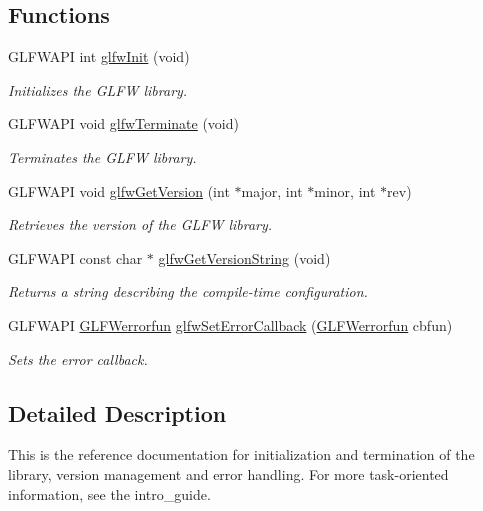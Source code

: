 \subsection*{Functions}
\begin{CompactItemize}
\item 
GLFWAPI int \hyperlink{group__init_gb41771f0215a2e0afb4cf1cf98082d40}{glfwInit} (void)
\begin{CompactList}\small\item\em Initializes the GLFW library. \item\end{CompactList}\item 
GLFWAPI void \hyperlink{group__init_gfd90e6fd4819ea9e22e5e739519a6504}{glfwTerminate} (void)
\begin{CompactList}\small\item\em Terminates the GLFW library. \item\end{CompactList}\item 
GLFWAPI void \hyperlink{group__init_g2402c7824ac0194c13722790ff9559ff}{glfwGetVersion} (int $\ast$major, int $\ast$minor, int $\ast$rev)
\begin{CompactList}\small\item\em Retrieves the version of the GLFW library. \item\end{CompactList}\item 
GLFWAPI const char $\ast$ \hyperlink{group__init_g4b9092ac5eace57d94d3cd551d6b8ded}{glfwGetVersionString} (void)
\begin{CompactList}\small\item\em Returns a string describing the compile-time configuration. \item\end{CompactList}\item 
GLFWAPI \hyperlink{group__init_g6f2c8574259246a83b1d0c3baf23046f}{GLFWerrorfun} \hyperlink{group__init_g5919096b958c47102126061fb5a6f9c3}{glfwSetErrorCallback} (\hyperlink{group__init_g6f2c8574259246a83b1d0c3baf23046f}{GLFWerrorfun} cbfun)
\begin{CompactList}\small\item\em Sets the error callback. \item\end{CompactList}\end{CompactItemize}


\subsection{Detailed Description}
This is the reference documentation for initialization and termination of the library, version management and error handling. For more task-oriented information, see the intro\_\-guide. 

